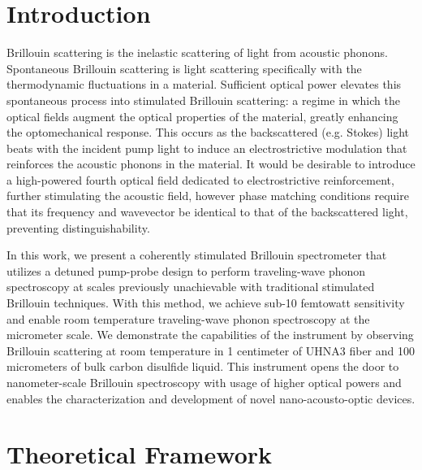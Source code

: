 \documentclass[%
  reprint,
  superscriptaddress,
  amsmath,amssymb,
  aps,
  prapplied,
]{revtex4-2}
\begin{document}

\maketitle



\section{Introduction}\label{sec:Introduction}

Brillouin scattering is the inelastic scattering of light from acoustic phonons. Spontaneous Brillouin scattering is light scattering specifically with the thermodynamic fluctuations in a material. Sufficient optical power elevates this spontaneous process into stimulated Brillouin scattering: a regime in which the optical fields augment the optical properties of the material, greatly enhancing the optomechanical response. This occurs as the backscattered (e.g. Stokes) light beats with the incident pump light to induce an electrostrictive modulation that reinforces the acoustic phonons in the material. It would be desirable to introduce a high-powered fourth optical field dedicated to electrostrictive reinforcement, further stimulating the acoustic field, however phase matching conditions require that its frequency and wavevector be identical to that of the backscattered light, preventing distinguishability.

In this work, we present a coherently stimulated Brillouin spectrometer that utilizes a detuned pump-probe design to perform traveling-wave phonon spectroscopy at scales previously unachievable with traditional stimulated Brillouin techniques. With this method, we achieve sub-10 femtowatt sensitivity and enable room temperature traveling-wave phonon spectroscopy at the micrometer scale. We demonstrate the capabilities of the instrument by observing Brillouin scattering at room temperature in 1 centimeter of UHNA3 fiber and 100 micrometers of bulk carbon disulfide liquid. This instrument opens the door to nanometer-scale Brillouin spectroscopy with usage of higher optical powers and enables the characterization and development of novel nano-acousto-optic devices.


\section{Theoretical Framework}\label{Theoretical Framework}
\end{document}
